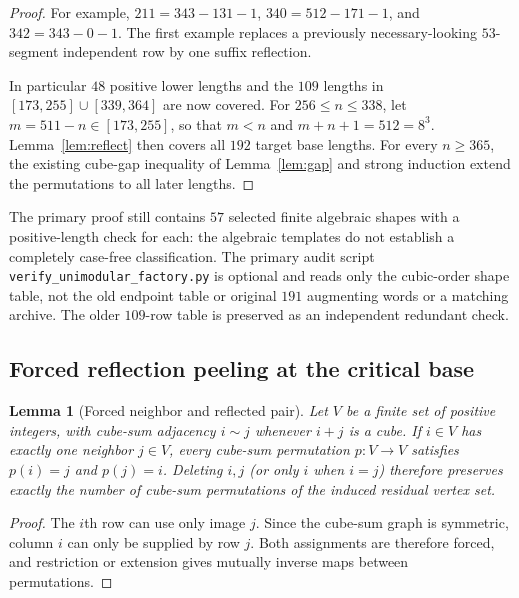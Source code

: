 \documentclass[10pt]{article}
\newtheorem{lemma}{Lemma}
\begin{document}
\begin{proof}
For example, $211=343-131-1$,
$340=512-171-1$, and $342=343-0-1$.
The first example replaces a previously
necessary-looking $53$-segment independent
row by one suffix reflection.


In particular $48$ positive lower lengths
and the $109$ lengths in
$[173,255]\cup[339,364]$ are now
covered. For $256\le n\le338$, let
$m=511-n\in[173,255]$, so that
$m<n$ and $m+n+1=512=8^3$.
Lemma~\ref{lem:reflect} then covers
all $192$ target base lengths.
For every $n\ge365$, the existing
cube-gap inequality of Lemma~\ref{lem:gap}
and strong induction extend the
permutations to all later lengths.
\end{proof}

The primary proof still contains $57$
selected finite algebraic shapes with a
positive-length check for each:
the algebraic templates do not establish
a completely case-free classification.
The primary audit script
\texttt{verify\_unimodular\_factory.py}
is optional and reads only the cubic-order
shape table, not the old endpoint table or original
$191$ augmenting words or a matching
archive. The older $109$-row table
is preserved as an independent
redundant check.

\subsection{Forced reflection peeling at the critical base}
\label{subsec:forced-reflection-peeling}

\begin{lemma}[Forced neighbor and reflected pair]
\label{lem:forced-neighbor}
Let $V$ be a finite set of positive integers, with
cube-sum adjacency $i\sim j$ whenever $i+j$ is a
cube. If $i\in V$ has exactly one neighbor $j\in V$,
every cube-sum permutation $p:V\to V$ satisfies
$p(i)=j$ and $p(j)=i$. Deleting $i,j$ (or only
$i$ when $i=j$) therefore preserves exactly the
number of cube-sum permutations of the induced
residual vertex set.
\end{lemma}
\begin{proof}
The $i$th row can use only image $j$.
Since the cube-sum graph is symmetric, column $i$
can only be supplied by row $j$. Both assignments
are therefore forced, and restriction or extension
gives mutually inverse maps between permutations.
\end{proof}
\end{document}
